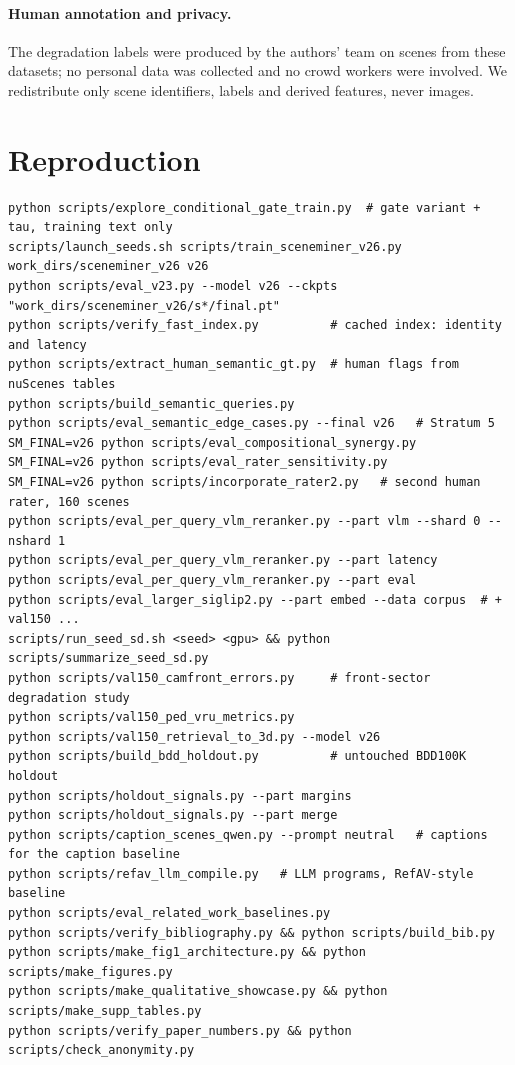 \documentclass[10pt,letterpaper]{article}
\begin{document}
\paragraph{Human annotation and privacy.} The degradation labels were produced by
the authors' team on scenes from these datasets; no personal data was collected and no crowd workers were involved. We redistribute only scene
identifiers, labels and derived features, never images.

\section{Reproduction}

{\small
\begin{verbatim}
python scripts/explore_conditional_gate_train.py  # gate variant + tau, training text only
scripts/launch_seeds.sh scripts/train_sceneminer_v26.py work_dirs/sceneminer_v26 v26
python scripts/eval_v23.py --model v26 --ckpts "work_dirs/sceneminer_v26/s*/final.pt"
python scripts/verify_fast_index.py          # cached index: identity and latency
python scripts/extract_human_semantic_gt.py  # human flags from nuScenes tables
python scripts/build_semantic_queries.py
python scripts/eval_semantic_edge_cases.py --final v26   # Stratum 5
SM_FINAL=v26 python scripts/eval_compositional_synergy.py
SM_FINAL=v26 python scripts/eval_rater_sensitivity.py
SM_FINAL=v26 python scripts/incorporate_rater2.py   # second human rater, 160 scenes
python scripts/eval_per_query_vlm_reranker.py --part vlm --shard 0 --nshard 1
python scripts/eval_per_query_vlm_reranker.py --part latency
python scripts/eval_per_query_vlm_reranker.py --part eval
python scripts/eval_larger_siglip2.py --part embed --data corpus  # + val150 ...
scripts/run_seed_sd.sh <seed> <gpu> && python scripts/summarize_seed_sd.py
python scripts/val150_camfront_errors.py     # front-sector degradation study
python scripts/val150_ped_vru_metrics.py
python scripts/val150_retrieval_to_3d.py --model v26
python scripts/build_bdd_holdout.py          # untouched BDD100K holdout
python scripts/holdout_signals.py --part margins
python scripts/holdout_signals.py --part merge
python scripts/caption_scenes_qwen.py --prompt neutral   # captions for the caption baseline
python scripts/refav_llm_compile.py   # LLM programs, RefAV-style baseline
python scripts/eval_related_work_baselines.py
python scripts/verify_bibliography.py && python scripts/build_bib.py
python scripts/make_fig1_architecture.py && python scripts/make_figures.py
python scripts/make_qualitative_showcase.py && python scripts/make_supp_tables.py
python scripts/verify_paper_numbers.py && python scripts/check_anonymity.py
\end{verbatim}
}
\end{document}
